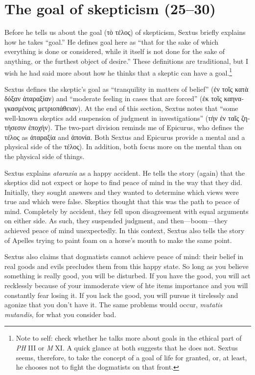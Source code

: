 \section{The goal of skepticism (25--30)}

Before he tells us about the goal (\textgreek{τὸ τέλος}) of skepticism, Sextus briefly explains how he takes ``goal.'' He defines goal here as ``that for the sake of which everything is done or considered, while it itself is not done for the sake of anything, or the furthest object of desire.'' These definitions are traditional, but I wish he had said more about how he thinks that a skeptic can have a goal.\footnote{Note to self: check whether he talks more about goals in the ethical part of \textit{PH} III or \textit{M} XI. A quick glance at both suggests that he does not. Sextus seems, therefore, to take the concept of a goal of life for granted, or, at least, he chooses not to fight the dogmatists on that front.}

Sextus defines the skeptic's goal as ``tranquility in matters of belief'' (\textgreek{ἐν τοῖς κατὰ δόξαν ἀταραξίαν}) and ``moderate feeling in cases that are forced'' (\textgreek{ἐκ τοῖς καηναγκασμένοις μετριοπάθειαν}). At the end of this section, Sextus notes that ``some well-known skeptics add suspension of judgment in investigations'' (\textgreek{τὴν ἐν ταῖς ζητήσεσιν ἐποχήν}). The two-part division reminds me of Epicurus, who defines the \textgreek{τέλος} as \textgreek{ἀταραξία} and \textgreek{ἀπονία}. Both Sextus and Epicurus provide a mental and a physical side of the \textgreek{τέλος}). In addition, both focus more on the mental than on the physical side of things.

Sextus explains \textit{ataraxia} as a happy accident. He tells the story (again) that the skeptics did not expect or hope to find peace of mind in the way that they did. Initially, they sought answers and they wanted to determine which views were true and which were false. Skeptics thought that this was the path to peace of mind. Completely by accident, they fell upon disagreement with equal arguments on either side. As such, they suspended judgment, and then---boom---they achieved peace of mind unexpectedly. In this context, Sextus also tells the story of Apelles trying to paint foam on a horse's mouth to make the same point.

Sextus also claims that dogmatists cannot achieve peace of mind: their belief in real goods and evils precludes them from this happy state. So long as you believe something is really good, you will be disturbed. If you have the good, you will act recklessly because of your immoderate view of hte items importance and you will constantly fear losing it. If you lack the good, you will pursue it tirelessly and agonize that you don't have it. The same problems would occur, \textit{mutatis mutandis}, for what you consider bad.

